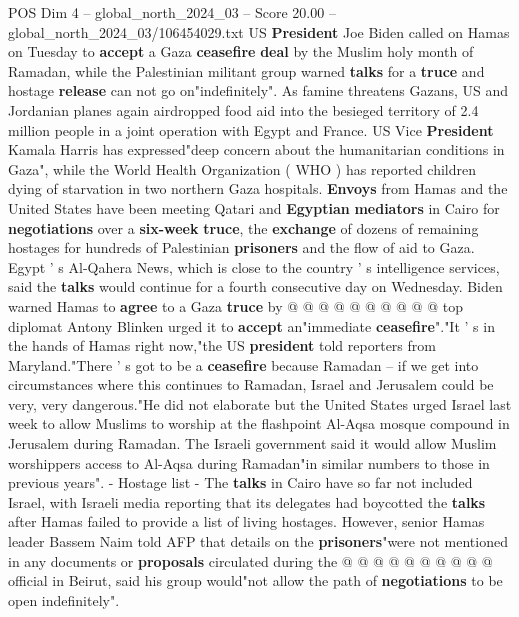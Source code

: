 \begin{textsample}{POS Dim 4 – global\_north\_2024\_03 – Score 20.00 – global\_north\_2024\_03/106454029.txt}  \label{ex:f4_pos_233}
US \textbf{President} Joe Biden called on Hamas on Tuesday to \textbf{accept} a Gaza \textbf{ceasefire} \textbf{deal} by the Muslim holy month of Ramadan, while the Palestinian militant group warned \textbf{talks} for a \textbf{truce} and hostage \textbf{release} can not go on"indefinitely".
As famine threatens Gazans, US and Jordanian planes again airdropped food aid into the besieged territory of 2.4 million people in a joint operation with Egypt and France.
US Vice \textbf{President} Kamala Harris has expressed"deep concern about the humanitarian conditions in Gaza", while the World Health Organization ( WHO ) has reported children dying of starvation in two northern Gaza hospitals. \textbf{Envoys} from Hamas and the United States have been meeting Qatari and \textbf{Egyptian} \textbf{mediators} in Cairo for \textbf{negotiations} over a \textbf{six-week} \textbf{truce}, the \textbf{exchange} of dozens of remaining hostages for hundreds of Palestinian \textbf{prisoners} and the flow of aid to Gaza.
Egypt ' s Al-Qahera News, which is close to the country ' s intelligence services, said the \textbf{talks} would continue for a fourth consecutive day on Wednesday.
Biden warned Hamas to \textbf{agree} to a Gaza \textbf{truce} by @ @ @ @ @ @ @ @ @ @ top diplomat Antony Blinken urged it to \textbf{accept} an"immediate \textbf{ceasefire}"."It ' s in the hands of Hamas right now,"the US \textbf{president} told reporters from Maryland."There ' s got to be a \textbf{ceasefire} because Ramadan -- if we get into circumstances where this continues to Ramadan, Israel and Jerusalem could be very, very dangerous."He did not elaborate but the United States urged Israel last week to allow Muslims to worship at the flashpoint Al-Aqsa mosque compound in Jerusalem during Ramadan.
The Israeli government said it would allow Muslim worshippers access to Al-Aqsa during Ramadan"in similar numbers to those in previous years". - Hostage list - The \textbf{talks} in Cairo have so far not included Israel, with Israeli media reporting that its delegates had boycotted the \textbf{talks} after Hamas failed to provide a list of living hostages.
However, senior Hamas leader Bassem Naim told AFP that details on the \textbf{prisoners}"were not mentioned in any documents or \textbf{proposals} circulated during the @ @ @ @ @ @ @ @ @ @ official in Beirut, said his group would"not allow the path of \textbf{negotiations} to be open indefinitely".

\end{textsample}
